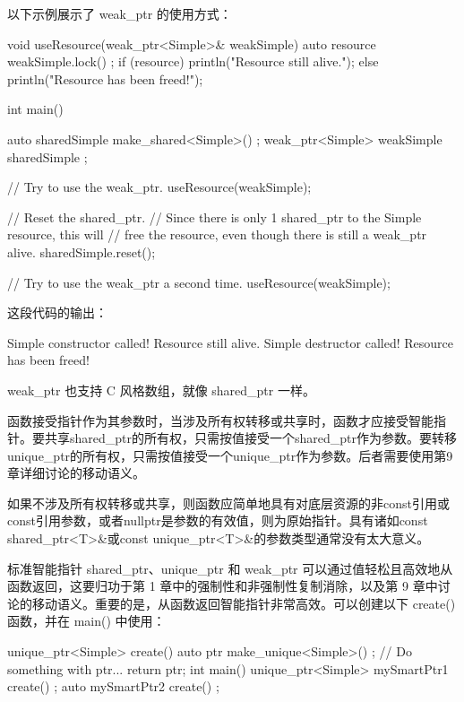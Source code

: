以下示例展示了 weak\_ptr 的使用方式：

\begin{cpp}
void useResource(weak_ptr<Simple>& weakSimple)
{
    auto resource { weakSimple.lock() };
    if (resource) { println("Resource still alive."); }
    else { println("Resource has been freed!"); }
}

int main()
{
    auto sharedSimple { make_shared<Simple>() };
    weak_ptr<Simple> weakSimple { sharedSimple };

    // Try to use the weak_ptr.
    useResource(weakSimple);

    // Reset the shared_ptr.
    // Since there is only 1 shared_ptr to the Simple resource, this will
    // free the resource, even though there is still a weak_ptr alive.
    sharedSimple.reset();

    // Try to use the weak_ptr a second time.
    useResource(weakSimple);
}
\end{cpp}

这段代码的输出：

\begin{shell}
Simple constructor called!
Resource still alive.
Simple destructor called!
Resource has been freed!
\end{shell}

weak\_ptr 也支持 C 风格数组，就像 shared\_ptr 一样。


函数接受指针作为其参数时，当涉及所有权转移或共享时，函数才应接受智能指针。要共享shared\_ptr的所有权，只需按值接受一个shared\_ptr作为参数。要转移unique\_ptr的所有权，只需按值接受一个unique\_ptr作为参数。后者需要使用第9章详细讨论的移动语义。

如果不涉及所有权转移或共享，则函数应简单地具有对底层资源的非const引用或const引用参数，或者nullptr是参数的有效值，则为原始指针。具有诸如const shared\_ptr<T>\&或const unique\_ptr<T>\&的参数类型通常没有太大意义。


标准智能指针 shared\_ptr、unique\_ptr 和 weak\_ptr 可以通过值轻松且高效地从函数返回，这要归功于第 1 章中的强制性和非强制性复制消除，以及第 9 章中讨论的移动语义。重要的是，从函数返回智能指针非常高效。可以创建以下 create() 函数，并在 main() 中使用：

\begin{cpp}
unique_ptr<Simple> create()
{
    auto ptr { make_unique<Simple>() };
    // Do something with ptr...
    return ptr;
}
int main()
{
    unique_ptr<Simple> mySmartPtr1 { create() };
    auto mySmartPtr2 { create() };
}

\end{cpp}


